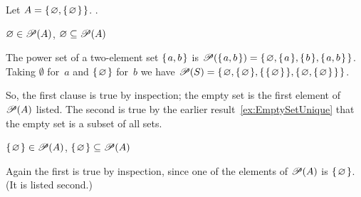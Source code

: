 \documentclass{test}  %
\begin{document}
\begin{problem}  Let $A=\set{\emptyset,\set{\emptyset}}$. \pord.
\begin{exes}
\begin{exercise} 
  $\emptyset\in\powerset(A)$, 
  $\emptyset\subseteq\powerset(A)$    
\end{exercise}
\begin{answer}
The power set of a two-element set $\set{a,b}$ is 
$\powerset(\set{a,b})=\set{\emptyset,\set{a},\set{b},\set{a,b}}$.
Taking $\emptyset$ for~$a$ and $\set{\emptyset}$ for~$b$ we have
$\powerset(S)=\set{\emptyset, \set{\emptyset}, \set{\set{\emptyset}}, 
                   \set{\emptyset, \set{\emptyset}}}$.

  So, the first clause is true by inspection; 
  the empty set is the first element
  of $\powerset(A)$ listed.
  The second is true by the earlier result~\ref{ex:EmptySetUnique}
  that the empty set is a subset of all sets.
\end{answer}
\begin{exercise} 
  $\set{\emptyset}\in\powerset(A)$, 
  $\set{\emptyset}\subseteq\powerset(A)$    
\end{exercise}
\begin{answer}
  Again the first is true by inspection, 
  since one of the elements of $\powerset(A)$ is 
  $\set{\emptyset}$.  (It is listed second.)


\end{answer}
\end{exes}
\end{problem}
\end{document}
